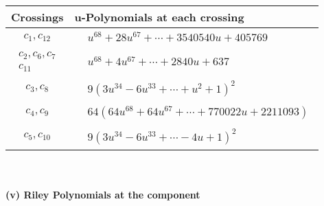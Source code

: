 \documentclass[1p]{elsarticle_modified}
\theoremstyle{definition}
\begin{document}
\begin{tabular}{m{50pt}|m{274pt}}
Crossings & \hspace{64pt}u-Polynomials at each crossing \\
\hline $$\begin{aligned}c_{1},c_{12}\end{aligned}$$&$\begin{aligned}
&u^{68}+28 u^{67}+\cdots+3540540 u+405769
\end{aligned}$\\
\hline $$\begin{aligned}c_{2},c_{6},c_{7}\\c_{11}\end{aligned}$$&$\begin{aligned}
&u^{68}+4 u^{67}+\cdots+2840 u+637
\end{aligned}$\\
\hline $$\begin{aligned}c_{3},c_{8}\end{aligned}$$&$\begin{aligned}
&9(3 u^{34}-6 u^{33}+\cdots+u^2+1)^{2}
\end{aligned}$\\
\hline $$\begin{aligned}c_{4},c_{9}\end{aligned}$$&$\begin{aligned}
&64(64 u^{68}+64 u^{67}+\cdots+770022 u+2211093)
\end{aligned}$\\
\hline $$\begin{aligned}c_{5},c_{10}\end{aligned}$$&$\begin{aligned}
&9(3 u^{34}-6 u^{33}+\cdots-4 u+1)^{2}
\end{aligned}$\\
\hline
\end{tabular}\\~\\
\newpage\renewcommand{\arraystretch}{1}
\flushleft \textbf{(v) Riley Polynomials at the component}\newline \\
\end{document}
